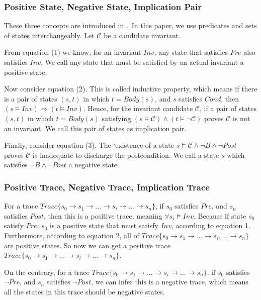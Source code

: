 \subsubsection{Positive State, Negative State, Implication Pair}
These three concepts are introduced in \cite{sharma2014invariant}.\
In this paper, we use predicates and sets of states interchangeably.
Let $\mathcal{C}$ be a candidate invariant.

From equation (1) we know, for an invariant $Inv$, 
any state that satisfies $Pre$ also satisfies $Inv$. 
We call any state that must be satisfied by an actual invariant a positive state. 


Now consider equation (2).
This is called inductive property, which means if there is a pair of states $(s, t)$ in which $t = Body(s)$, 
and $s$ satisfies $Cond$, then $(s \models Inv) \Rightarrow (t \models {Inv})$. 
Hence, for the invariant candidate $\mathcal{C}$, 
if a pair of states $(s, t)$ in which $t = Body(s)$ satisfying $(s \models \mathcal{C}) \wedge (t \models \neg \mathcal{C})$ proves $\mathcal{C}$ is not an invariant. 
We call this pair of states as implication pair.

Finally, consider equation (3).
The `existence of a state $s \models \mathcal{C} \wedge \neg B \wedge \neg Post$ proves $\mathcal{C}$ is inadequate to discharge the postcondition. 
We call a state $s$ which satisfies $\neg{B} \wedge \neg{Post}$ a negative state. 



\subsubsection{Positive Trace, Negative Trace, Implication Trace}
For a trace $Trace\{s_0 \to s_1 \to ... \to s_i \to ... \to s_n\}$, 
if $s_0$ satisfies $Pre$, and $s_n$ satisfies $Post$,
then this is a positive trace, meaning $\forall s_i \models Inv$.
Because if state $s_0$ satisfy $Pre$,
$s_0$ is a positive state that must satisfy $Inv$, according to equation 1.
Furthermore, according to equation 2,
all of $Trace\{s_0 \to s_1 \to ...\to s_i, ... \to s_n\}$ are positive states.
So now we can get a positive trace  $Trace\{s_0 \to s_1 \to ...\to s_i \to ... \to s_n\}$.

On the contrary, for a trace $Trace\{s_0 \to s_1 \to ...\to s_i \to ... \to s_n\}$, 
if $s_0$ satisfies $\neg Pre$, and $s_n$ satisfies $\neg Post$,
we can infer this is a negative trace, 
which means all the states in this trace should be negative states.  

